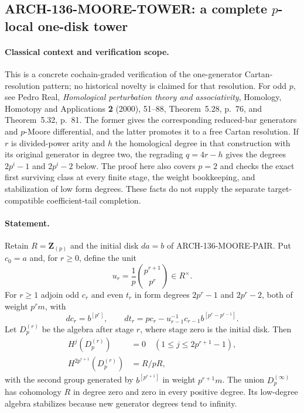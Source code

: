 \subsection{ARCH-136-MOORE-TOWER: a complete $p$-local one-disk tower}

\paragraph{Classical context and verification scope.}
This is a concrete cochain-graded verification of the one-generator
Cartan-resolution pattern; no historical novelty is claimed for that
resolution. For odd $p$, see Pedro Real, \emph{Homological perturbation
theory and associativity}, Homology, Homotopy and Applications
\textbf{2} (2000), 51--88, Theorem~5.28, p.~76, and
Theorem~5.32, p.~81. The former gives the corresponding reduced-bar
generators and $p$-Moore differential, and the latter promotes it
to a free Cartan resolution. If $r$ is divided-power arity and
$h$ the homological degree in that construction with its original
generator in degree two, the regrading $q=4r-h$ gives the degrees
$2p^i-1$ and $2p^i-2$ below. The proof here also covers $p=2$
and checks the exact first surviving class at every finite stage,
the weight bookkeeping, and stabilization of low form degrees.
These facts do not supply the separate target-compatible
coefficient-tail completion.

\paragraph{Statement.}
Retain $R=\mathbf Z_{(p)}$ and the initial disk $da=b$ of
ARCH-136-MOORE-PAIR.  Put $c_0=a$ and, for $r\geq0$, define the unit
\[
                 u_r=\frac1p\binom{p^{r+1}}{p^r}\in R^\times.
\]
For $r\geq1$ adjoin odd $c_r$ and even $t_r$ in form degrees
$2p^r-1$ and $2p^r-2$, both of weight $p^rm$, with
\[
 dc_r=b^{[p^r]},\qquad
 dt_r=pc_r-u_{r-1}^{-1}c_{r-1}
                            b^{[p^r-p^{r-1}]}.           \tag{136.MT1}
\]
Let $D_p^{(r)}$ be the algebra after stage $r$, where stage zero
is the initial disk.  Then
\[
 \begin{split}
 H^j(D_p^{(r)})&=0\quad(1\leq j\leq2p^{r+1}-1),\\
 H^{2p^{r+1}}(D_p^{(r)})&=R/pR,
 \end{split}                                             \tag{136.MT2}
\]
with the second group generated by $b^{[p^{r+1}]}$ in weight
$p^{r+1}m$.  The union $D_p^{(\infty)}$ has cohomology $R$ in
degree zero and zero in every positive degree.  Its low-degree
algebra stabilizes because new generator degrees tend to infinity.

